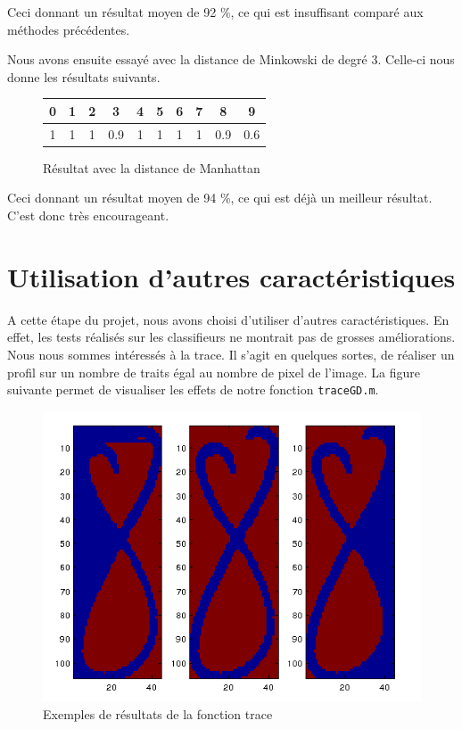 Ceci donnant un résultat moyen de 92 \%, ce qui est insuffisant
comparé aux méthodes précédentes.

Nous avons ensuite essayé avec la distance de Minkowski de degré 3.
Celle-ci nous donne les résultats suivants.

\begin{figure}[h!]
\centering
\begin{tabular}{|*{10}{c|}}
    \hline
    0 & 1 & 2 & 3 & 4 & 5 & 6 & 7 & 8 & 9 \\
    \hline
    1 & 1 & 1 & 0.9 & 1 & 1 & 1 & 1 & 0.9 & 0.6  \\
    \hline
\end{tabular}
\caption{Résultat avec la distance de Manhattan}
\end{figure} 

Ceci donnant un résultat moyen de 94 \%, ce qui est déjà un meilleur
résultat. C'est donc très encourageant.

\section{Utilisation d'autres caractéristiques}

A cette étape du projet, nous avons choisi d'utiliser d'autres     
caractéristiques. En effet, les tests réalisés sur les classifieurs
ne montrait pas de grosses améliorations. \\
Nous nous sommes intéressés à la trace. Il s'agit en quelques sortes, 
de réaliser un profil sur un nombre de traits égal au nombre de pixel de
l'image. La figure suivante permet de visualiser les effets de notre
fonction \texttt{traceGD.m}.

\begin{figure}[h!]
\centering
\includegraphics[scale=0.5]{trace.png}
\caption{Exemples de résultats de la fonction trace}
\end{figure}

